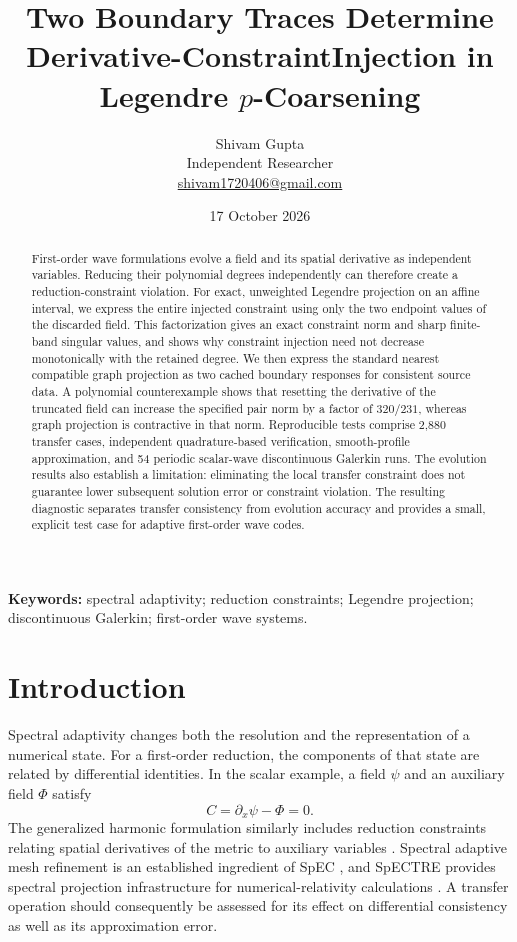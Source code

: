 \documentclass[11pt]{article}
\title{Two Boundary Traces Determine Derivative-Constraint\newline Injection in Legendre \(p\)-Coarsening}
\author{Shivam Gupta\\\small Independent Researcher\\\small\href{mailto:shivam1720406@gmail.com}{shivam1720406@gmail.com}}
\date{17 October 2026}
\begin{document}
\maketitle
\begin{abstract}
First-order wave formulations evolve a field and its spatial derivative as independent variables. Reducing their polynomial degrees independently can therefore create a reduction-constraint violation. For exact, unweighted Legendre projection on an affine interval, we express the entire injected constraint using only the two endpoint values of the discarded field. This factorization gives an exact constraint norm and sharp finite-band singular values, and shows why constraint injection need not decrease monotonically with the retained degree. We then express the standard nearest compatible graph projection as two cached boundary responses for consistent source data. A polynomial counterexample shows that resetting the derivative of the truncated field can increase the specified pair norm by a factor of \(320/231\), whereas graph projection is contractive in that norm. Reproducible tests comprise 2,880 transfer cases, independent quadrature-based verification, smooth-profile approximation, and 54 periodic scalar-wave discontinuous Galerkin runs. The evolution results also establish a limitation: eliminating the local transfer constraint does not guarantee lower subsequent solution error or constraint violation. The resulting diagnostic separates transfer consistency from evolution accuracy and provides a small, explicit test case for adaptive first-order wave codes.
\end{abstract}
\noindent\textbf{Keywords:} spectral adaptivity; reduction constraints; Legendre projection; discontinuous Galerkin; first-order wave systems.

\section{Introduction}
Spectral adaptivity changes both the resolution and the representation of a numerical state. For a first-order reduction, the components of that state are related by differential identities. In the scalar example, a field \(\psi\) and an auxiliary field \(\Phi\) satisfy
\begin{equation}\label{eq:constraint}
 C=\partial_x\psi-\Phi=0.
\end{equation}
The generalized harmonic formulation similarly includes reduction constraints relating spatial derivatives of the metric to auxiliary variables \cite{lindblom}. Spectral adaptive mesh refinement is an established ingredient of SpEC \cite{szilagyi}, and SpECTRE provides spectral projection infrastructure for numerical-relativity calculations \cite{kidder,spectre}. A transfer operation should consequently be assessed for its effect on differential consistency as well as its approximation error.
\end{document}
